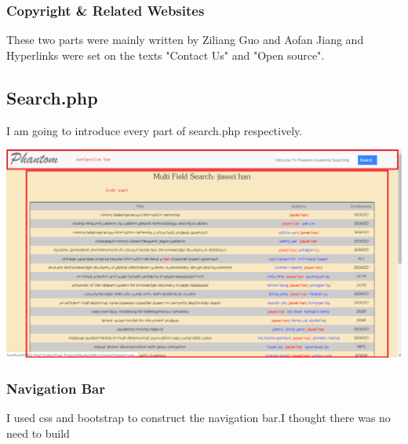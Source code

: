 \documentclass[10pt,twoside,a4paper,titlepage]{article}
\begin{document}
	\subsubsection{Copyright \& Related Websites}
	
	These two parts were mainly written by Ziliang Guo and Aofan Jiang and Hyperlinks were set on the texts "Contact Us" and "Open source".
	
	\subsection{Search.php}
	
	I am going to introduce every part of search.php respectively.
	\newline
	
	\includegraphics[width=1.0\textwidth]{cyf/SEARCH_struct1.png}
	
	\subsubsection{Navigation Bar}
	
	I used css and bootstrap to construct the navigation bar.I thought there was no need to build 
	
	
	
	
	
		
	
	 
	
	
	
\end{document}
